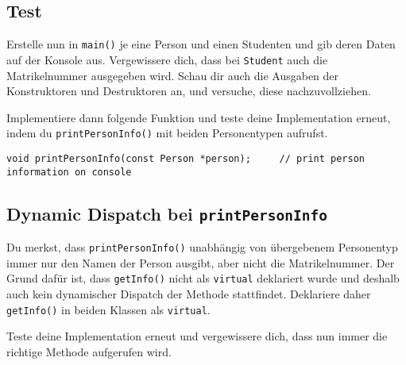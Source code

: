 
\subsection{Test}
Erstelle nun in \texttt{main()} je eine Person und einen Studenten und gib deren Daten auf der Konsole aus.
Vergewissere dich, dass bei \texttt{Student} auch die Matrikelnummer ausgegeben wird.
Schau dir auch die Ausgaben der Konstruktoren und Destruktoren an, und versuche, diese nachzuvollziehen.

Implementiere dann folgende Funktion und teste deine Implementation erneut, indem du \texttt{printPersonInfo()} mit beiden Personentypen aufrufst.

\begin{lstlisting}
void printPersonInfo(const Person *person);		// print person information on console
\end{lstlisting}



\subsection{Dynamic Dispatch bei \texttt{printPersonInfo}}
Du merkst, dass \texttt{printPersonInfo()} unabhängig von übergebenem Personentyp immer nur den Namen der Person ausgibt, aber nicht die Matrikelnummer.
Der Grund dafür ist, dass \texttt{getInfo()} nicht als \texttt{virtual} deklariert wurde und deshalb auch kein dynamischer Dispatch der Methode stattfindet.
Deklariere daher \texttt{getInfo()} in beiden Klassen als \texttt{virtual}.

Teste deine Implementation erneut und vergewissere dich, dass nun immer die richtige Methode aufgerufen wird.


